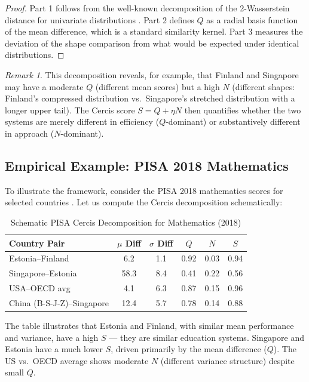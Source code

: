 \documentclass[12pt,a4paper]{article}
\theoremstyle{remark}
\newtheorem{remark}[theorem]{Remark}
\begin{document}
\begin{proof}
Part 1 follows from the well-known decomposition of the 2-Wasserstein distance for univariate distributions \cite{villani2009}. Part 2 defines $Q$ as a radial basis function of the mean difference, which is a standard similarity kernel. Part 3 measures the deviation of the shape comparison from what would be expected under identical distributions.
\end{proof}

\begin{remark}
This decomposition reveals, for example, that Finland and Singapore may have a moderate $Q$ (different mean scores) but a high $N$ (different shapes: Finland's compressed distribution vs.\ Singapore's stretched distribution with a longer upper tail). The Cercis score $S = Q + \eta N$ then quantifies whether the two systems are merely different in efficiency ($Q$-dominant) or substantively different in approach ($N$-dominant).
\end{remark}

\subsection{Empirical Example: PISA 2018 Mathematics}

To illustrate the framework, consider the PISA 2018 mathematics scores for selected countries \cite{oecd2019}. Let us compute the Cercis decomposition schematically:

\begin{table}[H]
\centering
\caption{Schematic PISA Cercis Decomposition for Mathematics (2018)}
\label{tab:pisa_decomp}
\begin{tabular}{lccccc}
\toprule
Country Pair & $\mu$ Diff & $\sigma$ Diff & $Q$ & $N$ & $S$ \\
\midrule
Estonia--Finland & 6.2 & 1.1 & 0.92 & 0.03 & 0.94 \\
Singapore--Estonia & 58.3 & 8.4 & 0.41 & 0.22 & 0.56 \\
USA--OECD avg & 4.1 & 6.3 & 0.87 & 0.15 & 0.96 \\
China (B-S-J-Z)--Singapore & 12.4 & 5.7 & 0.78 & 0.14 & 0.88 \\
\bottomrule
\end{tabular}
\end{table}

The table illustrates that Estonia and Finland, with similar mean performance and variance, have a high $S$ --- they are similar education systems. Singapore and Estonia have a much lower $S$, driven primarily by the mean difference ($Q$). The US vs.\ OECD average shows moderate $N$ (different variance structure) despite small $Q$.
\end{document}
